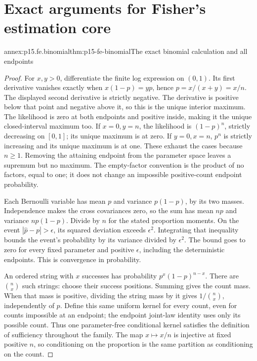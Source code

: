 \section{Exact arguments for Fisher's estimation core}
\label{sec:annex-p15-fisher-estimation}

\begin{annexitem}{annex:p15.fe.binomial}{thm:p15-fe-binomial}{The exact binomial calculation and all endpoints}
\begin{proof}
For \(x,y>0\), differentiate the finite log expression on \((0,1)\).
Its first derivative vanishes exactly when
\(x(1-p)=yp\), hence \(p=x/(x+y)=x/n\).
The displayed second derivative is strictly negative. The derivative
is positive below that point and negative above it, so this is the
unique interior maximum. The likelihood is zero at both endpoints
and positive inside, making it the unique closed-interval maximum too.
If \(x=0,y=n\), the likelihood is \((1-p)^n\), strictly decreasing
on \([0,1]\); its unique maximum is at zero. If \(y=0,x=n\),
\(p^n\) is strictly increasing and its unique maximum is at one.
These exhaust the cases because \(n\geq1\). Removing the attaining
endpoint from the parameter space leaves a supremum but no maximum.
The empty-factor convention is the product of no factors, equal to one;
it does not change an impossible positive-count endpoint probability.

Each Bernoulli variable has mean \(p\) and variance \(p(1-p)\),
by its two masses. Independence makes the cross covariances zero,
so the sum has mean \(np\) and variance \(np(1-p)\).
Divide by \(n\) for the stated proportion moments. On the event
\(|\widehat p-p|>\epsilon\), its squared deviation exceeds
\(\epsilon^2\). Integrating that inequality bounds the event's
probability by its variance divided by \(\epsilon^2\). The bound
goes to zero for every fixed parameter and positive \(\epsilon\),
including the deterministic endpoints. This is convergence in probability.

An ordered string with \(x\) successes has probability
\(p^x(1-p)^{n-x}\). There are \(\binom nx\) such strings:
choose their success positions. Summing gives the count mass.
When that mass is positive, dividing the string mass by it gives
\(1/\binom nx\), independently of \(p\). Define this same uniform
kernel for every count, even for counts impossible at an endpoint;
the endpoint joint-law identity uses only its possible count.
Thus one parameter-free conditional kernel satisfies the definition
of sufficiency throughout the family. The map \(x\mapsto x/n\)
is injective at fixed positive \(n\), so conditioning on the proportion
is the same partition as conditioning on the count.
\end{proof}
\end{annexitem}

